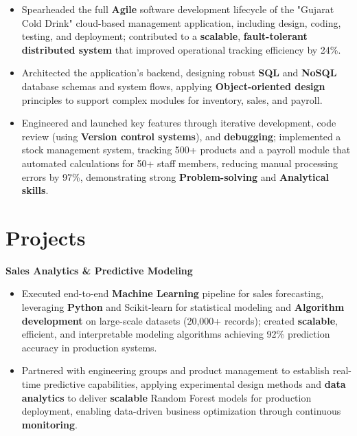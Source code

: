 \documentclass[a4paper,10pt]{article}
\begin{document}
\begin{itemize}[leftmargin=*, itemsep=0pt, parsep=1pt] %
\vspace{-7mm}
    \item Spearheaded the full \textbf{Agile} software development lifecycle of the "Gujarat Cold Drink" cloud-based management application, including design, coding, testing, and deployment; contributed to a \textbf{scalable}, \textbf{fault-tolerant distributed system} that improved operational tracking efficiency by 24\%.
    \item Architected the application's backend, designing robust \textbf{SQL} and \textbf{NoSQL} database schemas and system flows, applying \textbf{Object-oriented design} principles to support complex modules for inventory, sales, and payroll.
    \item Engineered and launched key features through iterative development, code review (using \textbf{Version control systems}), and \textbf{debugging}; implemented a stock management system, tracking 500+ products and a payroll module that automated calculations for 50+ staff members, reducing manual processing errors by 97\%, demonstrating strong \textbf{Problem-solving} and \textbf{Analytical skills}.
\end{itemize}

\vspace{-4mm}

\section*{Projects}
\textbf{Sales Analytics \& Predictive Modeling} \\
\begin{itemize}[leftmargin=*, itemsep=0pt, parsep=1pt]
\vspace{-7mm}
    \item Executed end-to-end \textbf{Machine Learning} pipeline for sales forecasting, leveraging \textbf{Python} and Scikit-learn for statistical modeling and \textbf{Algorithm development} on large-scale datasets (20,000+ records); created \textbf{scalable}, efficient, and interpretable modeling algorithms achieving 92\% prediction accuracy in production systems.
    \item Partnered with engineering groups and product management to establish real-time predictive capabilities, applying experimental design methods and \textbf{data analytics} to deliver \textbf{scalable} Random Forest models for production deployment, enabling data-driven business optimization through continuous \textbf{monitoring}.
    \end{itemize}
\end{document}
